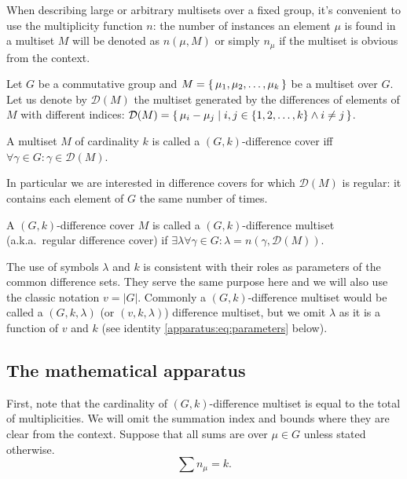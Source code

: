 When describing large or arbitrary multisets over a fixed group, it's convenient to use the multiplicity function $n$: the number of instances an element $\mu$ is found in a multiset $M$ will be denoted as $n(\mu,M)$ or simply $n_\mu$ if the multiset is obvious from the context.

Let $G$ be a commutative group and $M=\set{\mu_1, \mu_2, \ldots, \mu_k}$ be a multiset over $G$. Let us denote by $\mathcal D(M)$ the multiset generated by the differences of elements of $M$ with different indices: 
$\mathcal D (M) = \set{\mu_i-\mu_j \mid i, j \in \{1,2,\ldots,k\} \land i \neq j}$.

\begin{definition}
    \label{dms:def:dc}
    A multiset $M$ of cardinality $k$ is called a $(G,k)$-difference cover iff $\forall \gamma \in G \colon \gamma \in \mathcal D(M)$.
\end{definition}

In particular we are interested in difference covers 
for which $\mathcal D(M)$ is regular: it contains each element of $G$ the same number of times.

\begin{definition}
    \label{dms:def:dms}
    A $(G,k)$-difference cover $M$ is called a $(G,k)$-difference multiset (a.k.a.\ regular difference cover) if $\exists \lambda  \forall \gamma \in G \colon \lambda = n(\gamma, \mathcal D(M))$.
\end{definition}

The use of symbols $\lambda$ and $k$ is consistent with their roles as parameters of the common difference sets. They serve the same purpose here and we will also use the classic notation $v = |G|$. Commonly a $(G,k)$-difference multiset would be called a $(G,k,\lambda)$ (or $(v,k,\lambda)$) difference multiset, but we omit $\lambda$ as it is a function of $v$ and $k$ 
(see identity \eqref{apparatus:eq:parameters} below).


\subsection{The mathematical apparatus}
    \label{sec:apparatus}
    First, note that the cardinality of $(G,k)$-difference multiset is equal to the total of multiplicities. We will omit the summation index and bounds where they are clear from the context. Suppose that all sums are over $\mu \in G$ unless stated otherwise.
    \begin{equation}
        \label{apparatus:eq:ni}
        \sum {n_\mu} = k.
    \end{equation}
    
